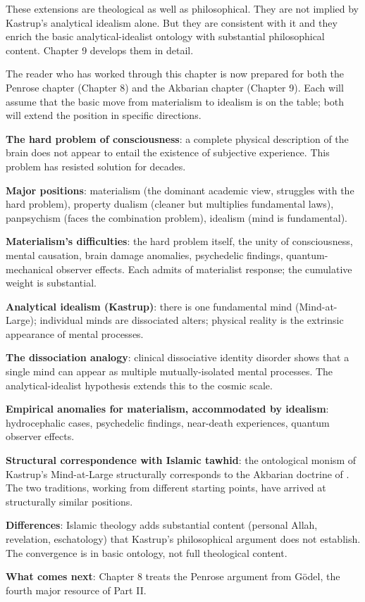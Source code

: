 These extensions are theological as well as philosophical. They are
not implied by Kastrup's analytical idealism alone. But they are
consistent with it and they enrich the basic analytical-idealist
ontology with substantial philosophical content. Chapter 9 develops
them in detail.

The reader who has worked through this chapter is now prepared for
both the Penrose chapter (Chapter 8) and the Akbarian chapter
(Chapter 9). Each will assume that the basic move from materialism
to idealism is on the table; both will extend the position in
specific directions.

\begin{summarybox}
\textbf{The hard problem of consciousness}: a complete physical
description of the brain does not appear to entail the existence of
subjective experience. This problem has resisted solution for
decades.

\textbf{Major positions}: materialism (the dominant academic view,
struggles with the hard problem), property dualism (cleaner but
multiplies fundamental laws), panpsychism (faces the combination
problem), idealism (mind is fundamental).

\textbf{Materialism's difficulties}: the hard problem itself, the
unity of consciousness, mental causation, brain damage anomalies,
psychedelic findings, quantum-mechanical observer effects. Each
admits of materialist response; the cumulative weight is substantial.

\textbf{Analytical idealism (Kastrup)}: there is one fundamental
mind (Mind-at-Large); individual minds are dissociated alters;
physical reality is the extrinsic appearance of mental processes.

\textbf{The dissociation analogy}: clinical dissociative identity
disorder shows that a single mind can appear as multiple
mutually-isolated mental processes. The analytical-idealist
hypothesis extends this to the cosmic scale.

\textbf{Empirical anomalies for materialism, accommodated by
idealism}: hydrocephalic cases, psychedelic findings, near-death
experiences, quantum observer effects.

\textbf{Structural correspondence with Islamic tawhid}: the
ontological monism of Kastrup's Mind-at-Large structurally
corresponds to the Akbarian doctrine of . The
two traditions, working from different starting points, have
arrived at structurally similar positions.

\textbf{Differences}: Islamic theology adds substantial content
(personal Allah, revelation, eschatology) that Kastrup's
philosophical argument does not establish. The convergence is in
basic ontology, not full theological content.

\textbf{What comes next}: Chapter 8 treats the Penrose argument
from G\"odel, the fourth major resource of Part II.
\end{summarybox}

\cleardoublepage
